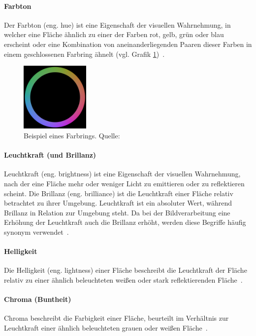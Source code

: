 \documentclass[12pt, a4paper, ngerman]{article}
\begin{document}
\paragraph{Farbton}
Der Farbton (eng. hue) ist eine Eigenschaft der visuellen Wahrnehmung, in welcher eine Fläche 
ähnlich zu einer der Farben rot, gelb, grün oder blau erscheint oder eine Kombination von 
aneinanderliegenden Paaren dieser Farben in einem geschlossenen Farbring ähnelt (vgl. Grafik \ref{fig:Hue})~\cite{Darktable_2023}. 

\begin{figure}
  \centering
  \includegraphics[width=0.3\textwidth]{Grafiken/Farbring.png}
  \caption{Beispiel eines Farbrings. Quelle: \cite{Hue_2023}}
  \label{fig:Hue}
\end{figure}

\paragraph{Leuchtkraft (und Brillanz)}
Leuchtkraft (eng. brightness) ist eine Eigenschaft der visuellen Wahrnehmung, 
nach der eine Fläche mehr oder weniger Licht zu emittieren oder zu reflektieren scheint. 
Die Brillanz (eng. brilliance) ist die Leuchtkraft einer Fläche relativ betrachtet zu ihrer Umgebung.
Leuchtkraft ist ein absoluter Wert, während Brillanz in Relation zur Umgebung steht.
Da bei der Bildverarbeitung eine Erhöhung der Leuchtkraft auch die Brillanz erhöht, 
werden diese Begriffe häufig synonym verwendet~\cite{Darktable_2023}.

\paragraph{Helligkeit}
Die Helligkeit (eng. lightness) einer Fläche beschreibt die Leuchtkraft der Fläche 
relativ zu einer ähnlich beleuchteten weißen oder stark reflektierenden Fläche~\cite{Darktable_2023}.

\paragraph{Chroma (Buntheit)}
Chroma beschreibt die Farbigkeit einer Fläche, beurteilt im Verhältnis zur Leuchtkraft 
einer ähnlich beleuchteten grauen oder weißen Fläche~\cite{Darktable_2023}. 
\end{document}
